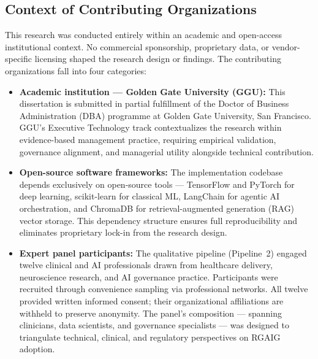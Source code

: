 \subsection{Context of Contributing Organizations}
\label{sec:contributing_orgs}

This research was conducted entirely within an academic and open-access institutional context. No commercial sponsorship, proprietary data, or vendor-specific licensing shaped the research design or findings. The contributing organizations fall into four categories:

\begin{itemize}[leftmargin=*, itemsep=3pt]
    \item \textbf{Academic institution --- Golden Gate University (GGU):} This dissertation is submitted in partial fulfillment of the Doctor of Business Administration (DBA) programme at Golden Gate University, San Francisco. GGU's Executive Technology track contextualizes the research within evidence-based management practice, requiring empirical validation, governance alignment, and managerial utility alongside technical contribution.

    \item \textbf{Open-source software frameworks:} The implementation codebase depends exclusively on open-source tools --- TensorFlow and PyTorch for deep learning, scikit-learn for classical ML, LangChain for agentic AI orchestration, and ChromaDB for retrieval-augmented generation (RAG) vector storage. This dependency structure ensures full reproducibility and eliminates proprietary lock-in from the research design.

    \item \textbf{Expert panel participants:} The qualitative pipeline (Pipeline~2) engaged twelve clinical and AI professionals drawn from healthcare delivery, neuroscience research, and AI governance practice. Participants were recruited through convenience sampling via professional networks. All twelve provided written informed consent; their organizational affiliations are withheld to preserve anonymity. The panel's composition --- spanning clinicians, data scientists, and governance specialists --- was designed to triangulate technical, clinical, and regulatory perspectives on RGAIG adoption.
\end{itemize}


